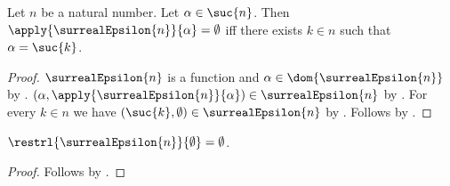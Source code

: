 \begin{proposition}\label{surreal_epsilon_negative_value}
    Let $n$ be a natural number.
    Let $\alpha\in\suc{n}$.
    Then $\apply{\surrealEpsilon{n}}{\alpha}=\emptyset$ iff
        there exists $k\in n$ such that $\alpha=\suc{k}$.
\end{proposition}
\begin{proof}
    $\surrealEpsilon{n}$ is a function and
        $\alpha\in\dom{\surrealEpsilon{n}}$
        by .
    $(\alpha,\apply{\surrealEpsilon{n}}{\alpha})
        \in\surrealEpsilon{n}$
        by .
    For every $k\in n$ we have
        $(\suc{k},\emptyset)\in\surrealEpsilon{n}$
        by .
    Follows by .
\end{proof}

\begin{proposition}\label{surreal_epsilon_restriction_empty}
    $\restrl{\surrealEpsilon{n}}{\emptyset}=\emptyset$.
\end{proposition}
\begin{proof}
    Follows by .
\end{proof}

